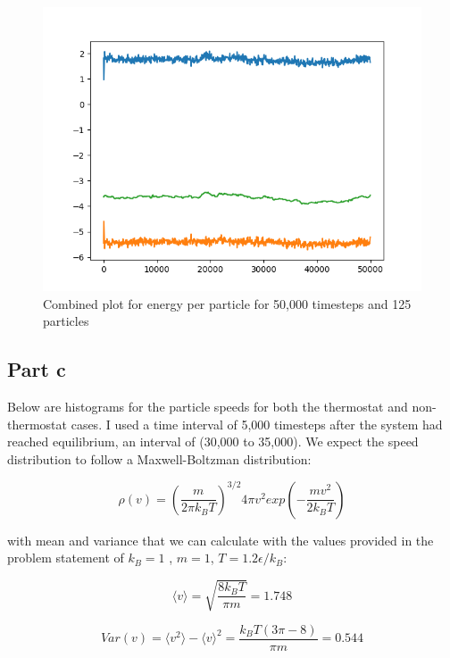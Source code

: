 \documentclass{article}
\begin{document}
	\begin{figure}[H]
				\centering
				\includegraphics[scale=0.5]{together_b}
				\caption{Combined plot for energy per particle for 50,000 timesteps and 125 particles}
	\end{figure}


\subsection*{Part c}

	Below are histograms for the particle speeds for both the thermostat and non-thermostat cases. I used a time interval of 5,000 timesteps after the system had reached equilibrium, an interval of (30,000 to 35,000). We expect the speed distribution to follow a Maxwell-Boltzman distribution:

	\[\rho (v) = (\frac{m}{2 \pi k_B T})^{3/2} 4 \pi v^2 exp(- \frac{mv^2}{2k_BT})\]

	with mean and variance that we can calculate with the values provided in the problem statement of $k_B = 1$ , $m = 1$, $T = 1.2 \epsilon / k_B$:

	\[\langle v \rangle = \sqrt{\frac{8k_BT}{\pi m}} = 1.748\]

	\[Var(v) = \langle v^2 \rangle - \langle v \rangle ^2 = \frac{k_BT(3 \pi - 8)}{\pi m} = 0.544\]
\end{document}

